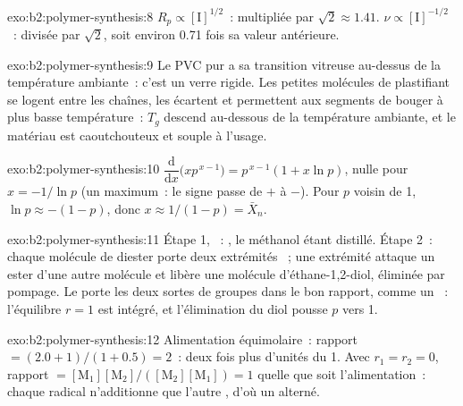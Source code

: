 \begin{solution}{exo:b2:polymer-synthesis:8}
$R_p \propto [\mathrm I]^{1/2}$~: multipliée par $\sqrt2 \approx 1.41$. $\nu \propto [\mathrm I]^{-1/2}$~:
divisée par $\sqrt 2$, soit environ 0.71 fois sa valeur antérieure.
\end{solution}

\begin{solution}{exo:b2:polymer-synthesis:9}
Le PVC pur a sa transition vitreuse au-dessus de la température ambiante~: c'est un verre rigide. Les
petites molécules de plastifiant se logent entre les chaînes, les écartent et permettent aux segments de
bouger à plus basse température~: $T_g$ descend
au-dessous de la température ambiante, et le matériau est caoutchouteux et souple à l'usage.
\end{solution}

\begin{solution}{exo:b2:polymer-synthesis:10}
$\dfrac{\mathrm d}{\mathrm dx}\bigl(x p^{\,x-1}\bigr) = p^{\,x-1}(1 + x\ln p)$, nulle pour $x = -1/\ln p$
(un maximum~: le signe passe de $+$ à $-$). Pour $p$ voisin de 1, $\ln p \approx -(1-p)$, donc $x \approx
1/(1-p) = \bar X_n$.
\end{solution}

\begin{solution}{exo:b2:polymer-synthesis:11}
Étape 1, ~: , le
méthanol étant distillé. Étape 2~: chaque molécule de diester porte deux extrémités ~; une
extrémité attaque un ester d'une autre molécule et libère une molécule d'éthane-1,2-diol, éliminée par
pompage. Le  porte les deux sortes de groupes dans le bon rapport, comme un  ~:
l'équilibre $r = 1$ est
intégré, et l'élimination du diol pousse $p$ vers 1.
\end{solution}

\begin{solution}{exo:b2:polymer-synthesis:12}
Alimentation équimolaire~: rapport $= (2.0 + 1)/(1 + 0.5) = 2$~: deux fois plus d'unités du  1.
Avec $r_1 = r_2 =
0$, rapport $= [\mathrm M_1][\mathrm M_2]/([\mathrm M_2][\mathrm M_1]) = 1$ quelle que soit l'alimentation~:
chaque radical n'additionne que l'autre , d'où un  alterné.
\end{solution}

